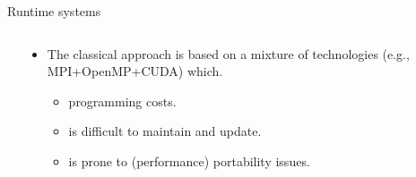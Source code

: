 \documentclass[unknownkeysallowed]{beamer}
\begin{document}
\begin{frame}{Runtime systems}
\begin{columns}
\begin{column}{0.45\textwidth}
    \end{column}
    \begin{column}{0.55\textwidth}
      \begin{itemize}
      \item<1->The classical approach is based on a mixture of
        technologies (e.g., MPI+OpenMP+CUDA) which.
        \begin{itemize}
        \item programming costs.
        \item is difficult to maintain and update.
        \item is prone to (performance) portability issues.
        \end{itemize}

\end{itemize}
\end{column}
\end{columns}
\end{frame}
\end{document}
